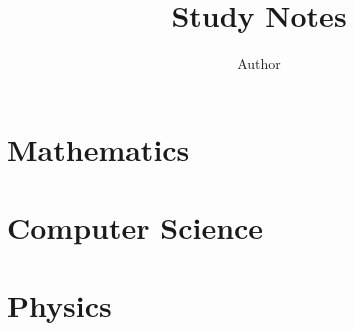 





\title{\bf \huge Study Notes}
\author{Author}
\maketitle
\setcounter{tocdepth}{2}

\tableofcontents
\listoffigures
\listoftheorems[ignoreall,show={theorem}]
\renewcommand{\listtheoremname}{List of Definitions}
\listoftheorems[ignoreall,show={definition}]

\printglossaries



\part{Mathematics}


\part{Computer Science}
% 


\part{Physics}
% 

\begin{appendices}

\end{appendices}

\backmatter


\printbibliography
\printindex


